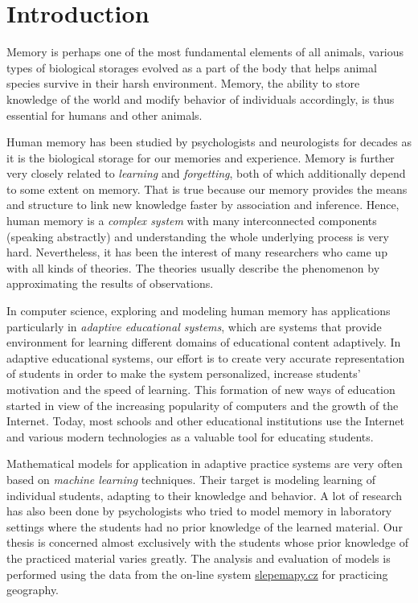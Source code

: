 \chapter{Introduction}

Memory is perhaps one of the most fundamental elements of all animals, various types of biological storages evolved as a part of the body that helps animal species survive in their harsh environment. Memory, the ability to store knowledge of the world and modify behavior of individuals accordingly, is thus essential for humans and other animals.

Human memory has been studied by psychologists and neurologists for decades as it is the biological storage for our memories and experience. Memory is further very closely related to \textit{learning} and \textit{forgetting}, both of which additionally depend to some extent on memory. That is true because our memory provides the means and structure to link new knowledge faster by association and inference. Hence, human memory is a \textit{complex system} with many interconnected components (speaking abstractly) and understanding the whole underlying process is very hard. Nevertheless, it has been the interest of many researchers who came up with all kinds of theories. The theories usually describe the phenomenon by approximating the results of observations.

In computer science, exploring and modeling human memory has applications particularly in \textit{adaptive educational systems}, which are systems that provide environment for learning different domains of educational content adaptively. In adaptive educational systems, our effort is to create very accurate representation of students in order to make the system personalized, increase students' motivation and the speed of learning. This formation of new ways of education started in view of the increasing popularity of computers and the growth of the Internet. Today, most schools and other educational institutions use the Internet and various modern technologies as a valuable tool for educating students.

Mathematical models for application in adaptive practice systems are very often based on \textit{machine learning} techniques. Their target is modeling learning of individual students, adapting to their knowledge and behavior. A lot of research has also been done by psychologists who tried to model memory in laboratory settings where the students had no prior knowledge of the learned material. Our thesis is concerned almost exclusively with the students whose prior knowledge of the practiced material varies greatly. The analysis and evaluation of models is performed using the data from the on-line system \url{slepemapy.cz} for practicing geography.

